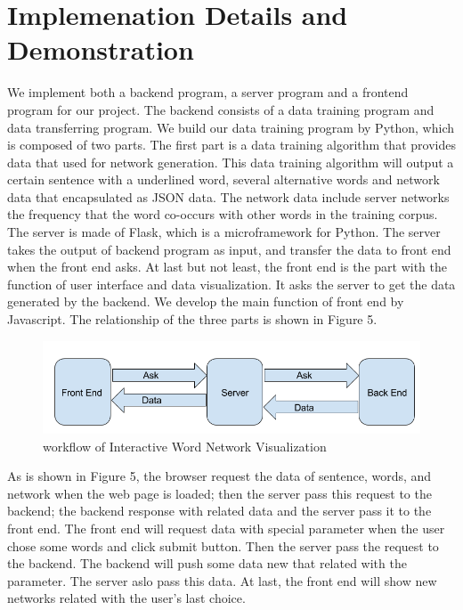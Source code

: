 \section{Implemenation Details and Demonstration}
\label{sec:impl}
We implement both a backend program, a server program and a frontend program for our project.  The backend consists of a data training program and data transferring program. We build our data training program by Python, which is composed of two parts. The first part is a data training algorithm that provides data that used for network generation. This data training algorithm will output a certain sentence with a underlined word, several alternative words and network data that encapsulated as JSON data.  The network data include server networks the frequency that the word co-occurs with other words in the training corpus. The server is made of Flask, which is a microframework for Python. The server takes the output of backend program as input, and transfer the data to front end when the front end asks. At last but not least, the front end is the part with the function of user interface and data visualization. It asks the server to get the data generated by the backend.  We develop the main function of front end by Javascript. The relationship of the three parts is shown in Figure 5. 

\begin{figure}[h]
\centering
		\includegraphics[width=\linewidth]{figure/workflow}
	\caption{workflow of Interactive Word Network Visualization}
	\label{fig:frp_demo}
\end{figure}

As is shown in Figure 5, the browser request the data of sentence, words, and network when the web page is loaded; then the server pass this request to the backend; the backend response with related data and the server pass it to the front end. 
The front end will request data with special parameter when the user chose some words and click submit button. Then the server pass the request to the backend. The backend will push some data new that related with the parameter. The server aslo pass this data. At last, the front end will show new networks related with the user's last choice.


